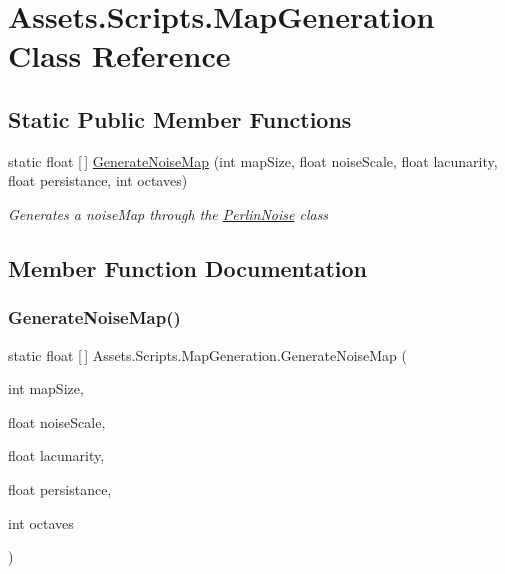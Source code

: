 \hypertarget{class_assets_1_1_scripts_1_1_map_generation}{}\section{Assets.\+Scripts.\+Map\+Generation Class Reference}
\label{class_assets_1_1_scripts_1_1_map_generation}
\subsection*{Static Public Member Functions}
\begin{DoxyCompactItemize}
\item 
static float \mbox{[}$\,$\mbox{]} \mbox{\hyperlink{class_assets_1_1_scripts_1_1_map_generation_a1b9a4afede5e30c156b0a9d848c9182a}{Generate\+Noise\+Map}} (int map\+Size, float noise\+Scale, float lacunarity, float persistance, int octaves)
\begin{DoxyCompactList}\small\item\em Generates a noise\+Map through the \mbox{\hyperlink{class_assets_1_1_scripts_1_1_perlin_noise}{Perlin\+Noise}} class \end{DoxyCompactList}\end{DoxyCompactItemize}


\subsection{Member Function Documentation}
\mbox{\label{class_assets_1_1_scripts_1_1_map_generation_a1b9a4afede5e30c156b0a9d848c9182a}} 
\subsubsection{\texorpdfstring{GenerateNoiseMap()}{GenerateNoiseMap()}}
{\footnotesize\ttfamily static float \mbox{[}$\,$\mbox{]} Assets.\+Scripts.\+Map\+Generation.\+Generate\+Noise\+Map (\begin{DoxyParamCaption}\item[{int}]{map\+Size,  }\item[{float}]{noise\+Scale,  }\item[{float}]{lacunarity,  }\item[{float}]{persistance,  }\item[{int}]{octaves }\end{DoxyParamCaption})\hspace{0.3cm}{\ttfamily [static]}}



